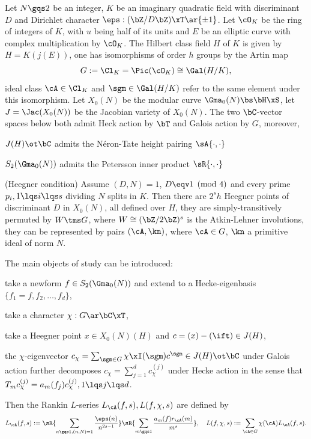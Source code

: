 \documentclass[a4paper, twoside]{article}
\begin{document}
\begin{stp}
	Let $N\gqs2$ be an integer, $K$ be an imaginary quadratic field with discriminant $D$ and Dirichlet character $\eps:(\bZ/D\bZ)\xT\ar\{\pm1\}$. Let $\cO_{K}$ be the ring of integers of $K$, with $u$ being half of its units and $E$ be an elliptic curve with complex multiplication by $\cO_{K}$. The Hilbert class field $H$ of $K$ is given by $H=K(j(E))$, one has isomorphisms of order $h$ groups by the Artin map
	\[
		G:=\Cl_{K}=\Pic(\cO_{K})\cong\Gal(H/K),
	\]
	ideal class $\cA\in\Cl_{K}$ and $\sgm\in\Gal(H/K)$ refer to the same element under this isomorphism. Let $X_{0}(N)$ be the modular curve $\Gma_{0}(N)\bs\bH\xS$, let $J=\Jac(X_{0}(N))$ be the Jacobian variety of $X_{0}(N)$. The two $\bC$-vector spaces below both admit Heck action by $\bT$ and Galois action by $G$, moreover,
	\begin{itm}
		\item $J(H)\ot\bC$ admits the N{\'e}ron-Tate height pairing $\sA{\cdot,\cdot}$
		\item $S_{2}(\Gma_{0}(N))$ admits the Petersson inner product $\sR{\cdot,\cdot}$
	\end{itm}

	(Heegner condition) Assume $(D,N)=1$, $D\eqv1\pmod{4}$ and every prime $p_{i},1\lqs i\lqs s$ dividing $N$ splits in $K$. Then there are $2^{s}h$ Heegner points of discriminant $D$ in $X_{0}(N)$, all defined over $H$, they are simply-transitively permuted by $W\tms G$, where $W\cong(\bZ/2\bZ)^{s}$ is the Atkin-Lehner involutions, they can be represented by pairs $(\cA,\kn)$, where $\cA\in G$, $\kn$ a primitive ideal of norm $N$.

	The main objects of study can be introduced:
	\begin{enr}
		\item take a newform $f\in S_{2}(\Gma_{0}(N))$ and extend to a Hecke-eigenbasis $\{f_{1}=f,f_{2},\ldots,f_{d}\}$,
		\item take a character $\chi:G\ar\bC\xT$,
		\item take a Heegner point $x\in X_{0}(N)(H)$ and $c=(x)-(\ift)\in J(H)$,
	\end{enr}
	the $\chi$-eigenvector $c_{\chi}=\sum_{\sgm\in G}\chi\xI(\sgm)c^{\sgm}\in J(H)\ot\bC$ under Galois action further decomposes $c_{\chi}=\sum_{j=1}^{d}c_{\chi}^{(j)}$ under Hecke action in the sense that $T_{m}c_{\chi}^{(j)}=a_{m}(f_{j})c_{\chi}^{(j)},1\lqs j\lqs d$.

	Then the Rankin $L$-series $L_{\cA}(f,s), L(f,\chi,s)$ are defined by
	\[
		L_{\cA}(f,s):=\sR{\sum_{n\gqs1,(n,N)=1}\frac{\eps(n)}{n^{2s-1}}}\sR{\sum_{m\gqs1}\frac{a_{m}(f)r_{\cA}(m)}{m^{s}}},\quad L(f,\chi,s):=\sum_{\cA\in G}\chi(\cA)L_{\cA}(f,s).
	\]
\end{stp}
\end{document}
